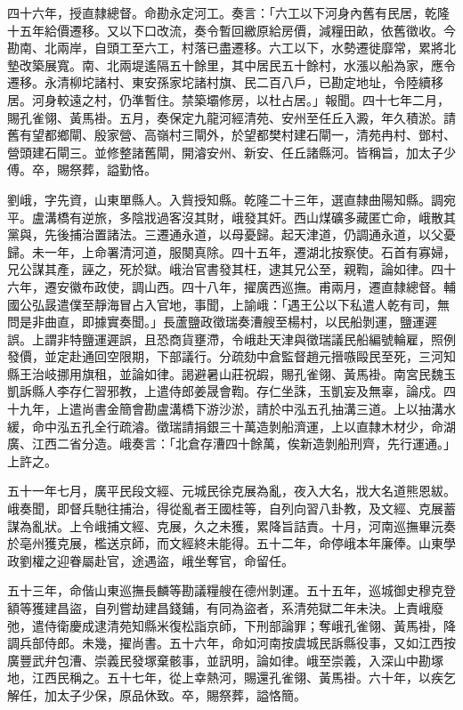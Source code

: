\begin{pinyinscope}
四十六年，授直隸總督。命勘永定河工。奏言：「六工以下河身內舊有民居，乾隆十五年給價遷移。又以下口改流，奏令暫回繳原給房價，減糧田畝，依舊徵收。今勘南、北兩岸，自頭工至六工，村落已盡遷移。六工以下，水勢遷徙靡常，累將北墊改築展寬。南、北兩堤遙隔五十餘里，其中居民五十餘村，水漲以船為家，應令遷移。永清柳坨諸村、東安孫家坨諸村旗、民二百八戶，已勘定地址，令陸續移居。河身較遠之村，仍準暫住。禁築壩修房，以杜占居。」報聞。四十七年二月，賜孔雀翎、黃馬褂。五月，奏保定九龍河經清苑、安州至任丘入澱，年久積淤。請舊有望都鄉閘、殷家營、高嶺村三閘外，於望都樊村建石閘一，清苑冉村、鄧村、營頭建石閘三。並修整諸舊閘，開濬安州、新安、任丘諸縣河。皆稱旨，加太子少傅。卒，賜祭葬，謚勤恪。

劉峨，字先資，山東單縣人。入貲授知縣。乾隆二十三年，選直隸曲陽知縣。調宛平。盧溝橋有逆旅，多陰戕過客沒其財，峨發其奸。西山煤礦多藏匿亡命，峨散其黨與，先後捕治置諸法。三遷通永道，以母憂歸。起天津道，仍調通永道，以父憂歸。未一年，上命署清河道，服闋真除。四十五年，遷湖北按察使。石首有寡婦，兄公謀其產，誣之，死於獄。峨治官書發其枉，逮其兄公至，親鞫，論如律。四十六年，遷安徽布政使，調山西。四十八年，擢廣西巡撫。甫兩月，遷直隸總督。輔國公弘晸遣僕至靜海冒占入官地，事聞，上諭峨：「遇王公以下私遣人乾有司，無問是非曲直，即據實奏聞。」長蘆鹽政徵瑞奏漕艘至楊村，以民船剝運，鹽運遲誤。上謂非特鹽運遲誤，且恐商貨壅滯，令峨赴天津與徵瑞議民船編號輪雇，照例發價，並定赴通回空限期，下部議行。分疏劾中倉監督趙元搢嗾毆民至死，三河知縣王治岐挪用旗租，並論如律。謁避暑山莊祝嘏，賜孔雀翎、黃馬褂。南宮民魏玉凱訴縣人李存仁習邪教，上遣侍郎姜晟會鞫。存仁坐誅，玉凱妄及無辜，論戍。四十九年，上遣尚書金簡會勘盧溝橋下游沙淤，請於中泓五孔抽溝三道。上以抽溝水緩，命中泓五孔全行疏濬。徵瑞請捐銀三十萬造剝船濟運，上以直隸木材少，命湖廣、江西二省分造。峨奏言：「北倉存漕四十餘萬，俟新造剝船刑齊，先行運通。」上許之。

五十一年七月，廣平民段文經、元城民徐克展為亂，夜入大名，戕大名道熊恩紱。峨奏聞，即督兵馳往捕治，得從亂者王國桂等，自列向習八卦教，及文經、克展蓄謀為亂狀。上令峨捕文經、克展，久之未獲，累降旨詰責。十月，河南巡撫畢沅奏於亳州獲克展，檻送京師，而文經終未能得。五十二年，命停峨本年廉俸。山東學政劉權之迎眷屬赴官，途遇盜，峨坐奪官，命留任。

五十三年，命偕山東巡撫長麟等勘議糧艘在德州剝運。五十五年，巡城御史穆克登額等獲建昌盜，自列嘗劫建昌錢鋪，有同為盜者，系清苑獄二年未決。上責峨廢弛，遣侍衛慶成逮清苑知縣米復松詣京師，下刑部論罪；奪峨孔雀翎、黃馬褂，降調兵部侍郎。未幾，擢尚書。五十六年，命如河南按虞城民訴縣役事，又如江西按廣豐武弁包漕、崇義民發塚棄骸事，並訊明，論如律。峨至崇義，入深山中勘塚地，江西民稱之。五十七年，從上幸熱河，賜還孔雀翎、黃馬褂。六十年，以疾乞解任，加太子少保，原品休致。卒，賜祭葬，謚恪簡。


\end{pinyinscope}
